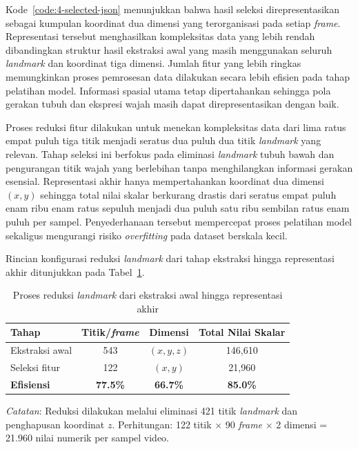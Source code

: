 Kode~\ref{code:4-selected-json} menunjukkan bahwa hasil seleksi direpresentasikan sebagai kumpulan koordinat dua dimensi yang terorganisasi pada setiap \textit{frame}. 
Representasi tersebut menghasilkan kompleksitas data yang lebih rendah dibandingkan struktur hasil ekstraksi awal yang masih menggunakan seluruh \textit{landmark} dan koordinat tiga dimensi. 
Jumlah fitur yang lebih ringkas memungkinkan proses pemrosesan data dilakukan secara lebih efisien pada tahap pelatihan model. 
Informasi spasial utama tetap dipertahankan sehingga pola gerakan tubuh dan ekspresi wajah masih dapat direpresentasikan dengan baik.

Proses reduksi fitur dilakukan untuk menekan kompleksitas data dari lima ratus empat puluh tiga titik menjadi seratus dua puluh dua titik \textit{landmark} yang relevan. 
Tahap seleksi ini berfokus pada eliminasi \textit{landmark} tubuh bawah dan pengurangan titik wajah yang berlebihan tanpa menghilangkan informasi gerakan esensial. 
Representasi akhir hanya mempertahankan koordinat dua dimensi $(x,y)$ sehingga total nilai skalar berkurang drastis dari seratus empat puluh enam ribu enam ratus sepuluh menjadi dua puluh satu ribu sembilan ratus enam puluh per sampel. 
Penyederhanaan tersebut mempercepat proses pelatihan model sekaligus mengurangi risiko \textit{overfitting} pada dataset berskala kecil.

Rincian konfigurasi reduksi \textit{landmark} dari tahap ekstraksi hingga representasi akhir ditunjukkan pada Tabel~\ref{tab:4-landmark-reduction}.
\begin{table}[H]
	\centering
	\caption{Proses reduksi \textit{landmark} dari ekstraksi awal hingga representasi akhir}
	\label{tab:4-landmark-reduction}
	\begin{tabular}{|l|c|c|c|}
	\hline
	\textbf{Tahap} & \textbf{Titik/\textit{frame}} & \textbf{Dimensi} & \textbf{Total Nilai Skalar} \\ \hline
	Ekstraksi awal & 543 & $(x,y,z)$ & 146,610 \\ \hline
	Seleksi fitur & 122 & $(x,y)$ & 21,960 \\ \hline
	\textbf{Efisiensi} & \textbf{77.5\%} & \textbf{66.7\%} & \textbf{85.0\%} \\ \hline
	\end{tabular}
	\vspace{0.5em}
	
	{\footnotesize \textit{Catatan}: Reduksi dilakukan melalui eliminasi 421 titik \textit{landmark} dan penghapusan koordinat $z$. Perhitungan: 122 titik $\times$ 90 \textit{frame} $\times$ 2 dimensi = 21.960 nilai numerik per sampel video.}
\end{table}

